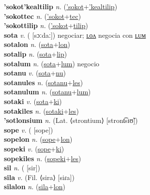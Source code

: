 \textbf{'sokot'kealtilip} \textit{n.} (\hyperref['sokot]{'sokot}+\hyperref['kealtilip]{'kealtilip})
 \label{'sokot'kealtilip} \\
\textbf{'sokottec} \textit{n.} (\hyperref['sokot]{'sokot}+\hyperref[tec]{tec})
 \label{'sokottec} \\
\textbf{'sokottilip} \textit{n.} (\hyperref['sokot]{'sokot}+\hyperref[tilip]{tilip})
 \label{'sokottilip} \\
\textbf{sota} \textit{v.} ( [sɔːdaː])
negociar; \hyperref[sotalon]{ʟᴏᴧ} negocia con \hyperref[sotalum]{ʟᴜᴍ} \label{sota} \\
\textbf{sotalon} \textit{n.} (\hyperref[sota]{sota}+\hyperref[lon]{lon})
 \label{sotalon} \\
\textbf{sotalip} \textit{n.} (\hyperref[sota]{sota}+\hyperref[lip]{lip})
 \label{sotalip} \\
\textbf{sotalum} \textit{n.} (\hyperref[sota]{sota}+\hyperref[lum]{lum})
negocio \label{sotalum} \\
\textbf{sotanu} \textit{v.} (\hyperref[sota]{sota}+\hyperref[nu]{nu})
 \label{sotanu} \\
\textbf{sotanules} \textit{n.} (\hyperref[sotanu]{sotanu}+\hyperref[les]{les})
 \label{sotanules} \\
\textbf{sotanulum} \textit{n.} (\hyperref[sotanu]{sotanu}+\hyperref[lum]{lum})
 \label{sotanulum} \\
\textbf{sotaki} \textit{v.} (\hyperref[sota]{sota}+\hyperref[ki]{ki})
 \label{sotaki} \\
\textbf{sotakiles} \textit{n.} (\hyperref[sotaki]{sotaki}+\hyperref[les]{les})
 \label{sotakiles} \\
\textbf{'sotlonsium} \textit{n.} (Lat. ⟨strontium⟩ [stront͡sɪʊ̃])
 \label{'sotlonsium} \\
\textbf{sope} \textit{v.} ( [sope])
 \label{sope} \\
\textbf{sopelon} \textit{n.} (\hyperref[sope]{sope}+\hyperref[lon]{lon})
 \label{sopelon} \\
\textbf{sopeki} \textit{v.} (\hyperref[sope]{sope}+\hyperref[ki]{ki})
 \label{sopeki} \\
\textbf{sopekiles} \textit{n.} (\hyperref[sopeki]{sopeki}+\hyperref[les]{les})
 \label{sopekiles} \\
\textbf{sil} \textit{n.} ( [sir])
 \label{sil} \\
\textbf{sila} \textit{v.} (Fil. ⟨sira⟩ [siɾa])
 \label{sila} \\
\textbf{silalon} \textit{n.} (\hyperref[sila]{sila}+\hyperref[lon]{lon})
